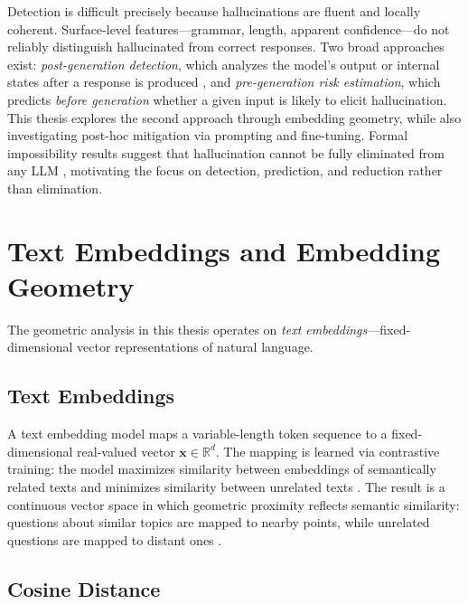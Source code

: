Detection is difficult precisely because hallucinations are fluent and locally coherent. Surface-level features---grammar, length, apparent confidence---do not reliably distinguish hallucinated from correct responses. Two broad approaches exist: \emph{post-generation detection}, which analyzes the model's output or internal states after a response is produced \citep{manakul2023selfcheckgpt, farquhar2024detecting}, and \emph{pre-generation risk estimation}, which predicts \emph{before generation} whether a given input is likely to elicit hallucination. This thesis explores the second approach through embedding geometry, while also investigating post-hoc mitigation via prompting and fine-tuning. Formal impossibility results suggest that hallucination cannot be fully eliminated from any LLM \citep{xu2024hallucination}, motivating the focus on detection, prediction, and reduction rather than elimination.

\section{Text Embeddings and Embedding Geometry}
\label{sec:bg-embeddings}

The geometric analysis in this thesis operates on \emph{text embeddings}---fixed-dimensional vector representations of natural language.

\subsection{Text Embeddings}
\label{sec:bg-text-embeddings}

A text embedding model maps a variable-length token sequence to a fixed-dimensional real-valued vector $\mathbf{x} \in \mathbb{R}^d$. The mapping is learned via contrastive training: the model maximizes similarity between embeddings of semantically related texts and minimizes similarity between unrelated texts \citep{reimers2019sentencebert}. The result is a continuous vector space in which geometric proximity reflects semantic similarity: questions about similar topics are mapped to nearby points, while unrelated questions are mapped to distant ones \citep{bengio2013representation}.

\subsection{Cosine Distance}
\label{sec:bg-cosine}

